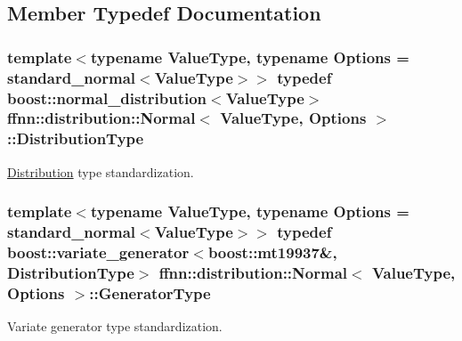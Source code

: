 \subsection{Member Typedef Documentation}
\hypertarget{classffnn_1_1distribution_1_1_normal_adde295df2a62b40cbfb9ea9728a72994}{
\subsubsection[{Distribution\-Type}]{\setlength{\rightskip}{0pt plus 5cm}template$<$typename Value\-Type, typename Options = standard\-\_\-normal$<$\-Value\-Type$>$$>$ typedef boost\-::normal\-\_\-distribution$<$Value\-Type$>$ {\bf ffnn\-::distribution\-::\-Normal}$<$ Value\-Type, Options $>$\-::{\bf Distribution\-Type}}}\label{classffnn_1_1distribution_1_1_normal_adde295df2a62b40cbfb9ea9728a72994}


\hyperlink{classffnn_1_1distribution_1_1_distribution}{Distribution} type standardization. 

\hypertarget{classffnn_1_1distribution_1_1_normal_a6d8c98f74c7c9fa77fa9caab1061e9b1}{
\subsubsection[{Generator\-Type}]{\setlength{\rightskip}{0pt plus 5cm}template$<$typename Value\-Type, typename Options = standard\-\_\-normal$<$\-Value\-Type$>$$>$ typedef boost\-::variate\-\_\-generator$<$boost\-::mt19937\&, {\bf Distribution\-Type}$>$ {\bf ffnn\-::distribution\-::\-Normal}$<$ Value\-Type, Options $>$\-::{\bf Generator\-Type}}}\label{classffnn_1_1distribution_1_1_normal_a6d8c98f74c7c9fa77fa9caab1061e9b1}


Variate generator type standardization. 



